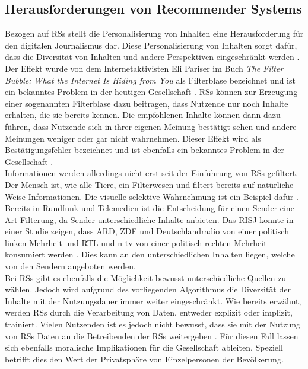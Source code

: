 \subsection{Herausforderungen von Recommender Systems}
Bezogen auf \acp{RS} stellt die Personalisierung von Inhalten eine Herausforderung für den digitalen Journalismus dar.
Diese Personalisierung von Inhalten sorgt dafür, dass die Diversität von Inhalten und andere Perspektiven eingeschränkt werden \cite{rundfunk}.
Der Effekt wurde von dem Internetaktivisten Eli Pariser im Buch \textit{The Filter Bubble: What the Internet Is Hiding from You} als Filterblase bezeichnet und ist ein bekanntes Problem in der heutigen Gesellschaft \cite{filter-bubble}.
\acp{RS} können zur Erzeugung einer sogenannten Filterblase dazu beitragen, dass Nutzende nur noch Inhalte erhalten, die sie bereits kennen.
Die empfohlenen Inhalte können dann dazu führen, dass Nutzende sich in ihrer eigenen Meinung bestätigt sehen und andere Meinungen weniger oder gar nicht wahrnehmen.
Dieser Effekt wird als Bestätigungsfehler bezeichnet und ist ebenfalls ein bekanntes Problem in der Gesellschaft \cite{reasoning-rule}. \\

Informationen werden allerdings nicht erst seit der Einführung von \acp{RS} gefiltert.
Der Mensch ist, wie alle Tiere, ein \glqq Filterwesen\grqq{} und filtert bereits auf natürliche Weise Informationen.
Die visuelle selektive Wahrnehmung ist ein Beispiel dafür \cite{selective-perception}.
Bereits in Rundfunk und Telemedien ist die Entscheidung für einen Sender eine Art Filterung, da Sender unterschiedliche Inhalte anbieten.
Das \ac{RISJ} konnte in einer Studie zeigen, dass ARD, ZDF und Deutschlandradio von einer politisch linken Mehrheit und RTL und n-tv von einer politisch rechten Mehrheit konsumiert werden \cite{public-service-news}.
Dies kann an den unterschiedlichen Inhalten liegen, welche von den Sendern angeboten werden. \\

Bei \acp{RS} gibt es ebenfalls die Möglichkeit bewusst unterschiedliche Quellen zu wählen.
Jedoch wird aufgrund des vorliegenden Algorithmus die Diversität der Inhalte mit der Nutzungsdauer immer weiter eingeschränkt.
Wie bereits erwähnt, werden \acp{RS} durch die Verarbeitung von Daten, entweder explizit oder implizit, trainiert.
Vielen Nutzenden ist es jedoch nicht bewusst, dass sie mit der Nutzung von \acp{RS} Daten an die Betreibenden der \acp{RS} weitergeben \cite{privacy-rs}.
Für diesen Fall lassen sich ebenfalls moralische Implikationen für die Gesellschaft ableiten.
Speziell betrifft dies den Wert der Privatsphäre von Einzelpersonen der Bevölkerung.\\

